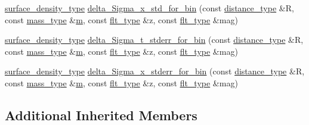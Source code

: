 \begin{DoxyCompactItemize}
\item 
\hyperlink{namespaceIceBRG_a80c597ef5ba0a32491d32a9f0083b02d}{surface\-\_\-density\-\_\-type} \hyperlink{classIceBRG_1_1pair__binner_aaa1bc2defcf7bdfe26179a089565e30c}{delta\-\_\-\-Sigma\-\_\-x\-\_\-std\-\_\-for\-\_\-bin} (const \hyperlink{namespaceIceBRG_a45499647eb87e24c10ab32c628711cec}{distance\-\_\-type} \&R, const \hyperlink{namespaceIceBRG_a1be72ac4918a9b029f2eefa084213e35}{mass\-\_\-type} \&\hyperlink{namespaceIceBRG_ada6365c5d16106f0608afbd34f010bcc}{m}, const \hyperlink{lib_2IceBRG__main_2common_8h_ad0f130a56eeb944d9ef2692ee881ecc4}{flt\-\_\-type} \&z, const \hyperlink{lib_2IceBRG__main_2common_8h_ad0f130a56eeb944d9ef2692ee881ecc4}{flt\-\_\-type} \&mag)
\item 
\hyperlink{namespaceIceBRG_a80c597ef5ba0a32491d32a9f0083b02d}{surface\-\_\-density\-\_\-type} \hyperlink{classIceBRG_1_1pair__binner_a3c32bd86aa89de0ef6ad1fca5097f41c}{delta\-\_\-\-Sigma\-\_\-t\-\_\-stderr\-\_\-for\-\_\-bin} (const \hyperlink{namespaceIceBRG_a45499647eb87e24c10ab32c628711cec}{distance\-\_\-type} \&R, const \hyperlink{namespaceIceBRG_a1be72ac4918a9b029f2eefa084213e35}{mass\-\_\-type} \&\hyperlink{namespaceIceBRG_ada6365c5d16106f0608afbd34f010bcc}{m}, const \hyperlink{lib_2IceBRG__main_2common_8h_ad0f130a56eeb944d9ef2692ee881ecc4}{flt\-\_\-type} \&z, const \hyperlink{lib_2IceBRG__main_2common_8h_ad0f130a56eeb944d9ef2692ee881ecc4}{flt\-\_\-type} \&mag)
\item 
\hyperlink{namespaceIceBRG_a80c597ef5ba0a32491d32a9f0083b02d}{surface\-\_\-density\-\_\-type} \hyperlink{classIceBRG_1_1pair__binner_aacd662f4665abf4678344f14b6e77f35}{delta\-\_\-\-Sigma\-\_\-x\-\_\-stderr\-\_\-for\-\_\-bin} (const \hyperlink{namespaceIceBRG_a45499647eb87e24c10ab32c628711cec}{distance\-\_\-type} \&R, const \hyperlink{namespaceIceBRG_a1be72ac4918a9b029f2eefa084213e35}{mass\-\_\-type} \&\hyperlink{namespaceIceBRG_ada6365c5d16106f0608afbd34f010bcc}{m}, const \hyperlink{lib_2IceBRG__main_2common_8h_ad0f130a56eeb944d9ef2692ee881ecc4}{flt\-\_\-type} \&z, const \hyperlink{lib_2IceBRG__main_2common_8h_ad0f130a56eeb944d9ef2692ee881ecc4}{flt\-\_\-type} \&mag)
\end{DoxyCompactItemize}
\subsection*{Additional Inherited Members}


